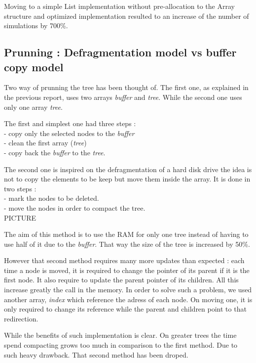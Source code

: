 Moving to a simple List implementation without pre-allocation to the Array structure and optimized implementation resulted to an increase of the number of simulations by 700\%.

\subsection{Prunning : Defragmentation model vs buffer copy model}

Two way of prunning the tree has been thought of. The first one, as  explained in the previous report, uses two arrays \textit{buffer} and \textit{tree}. While the second one uses only one array \textit{tree}.

The first and simplest one had three steps : \\
- copy only the selected nodes to the \textit{buffer} \\
- clean the first array (\textit{tree}) \\
- copy back the \textit{buffer} to the \textit{tree}.

The second one is inspired on the defragmentation of a hard disk drive the idea is not to copy the elements to be keep but move them inside the array. It is done in two steps : \\
- mark the nodes to be deleted. \\
- move the nodes in order to compact the tree. \\


PICTURE 


The aim of this method is to use the RAM for only one tree instead of having to use half of it due to the \textit{buffer}. That way the size of the tree is increased by 50\%.

However that second method requires many more updates than expected : 
each time a node is moved, it is required to change the pointer of its parent if it is the first node. It also require to update the parent pointer of its children. All this increase greatly the call in the memory. In order to solve such a problem, we used another array, \textit{index} which reference the adress of each node. On moving one, it is only required to change its reference while the parent and children point to that redirection.

While the benefits of such implementation is clear. On greater trees the time spend compacting grows too much in comparison to the first method. Due to such heavy drawback. That second method has been droped.